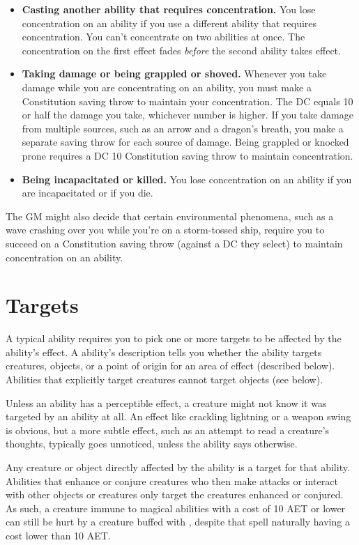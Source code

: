 \begin{itemize}
    \item \textbf{Casting another ability that requires concentration.} You lose concentration on an ability if you use a different ability that requires concentration. You can't concentrate on two abilities at once. The concentration on the first effect fades \textit{before} the second ability takes effect.
    \item \textbf{Taking damage or being grappled or shoved.} Whenever you take damage while you are concentrating on an ability, you must make a Constitution saving throw to maintain your concentration. The DC equals 10 or half the damage you take, whichever number is higher. If you take damage from multiple sources, such as an arrow and a dragon's breath, you make a separate saving throw for each source of damage. Being grappled or knocked prone requires a DC 10 Constitution saving throw to maintain concentration.
    \item \textbf{Being incapacitated or killed.} You lose concentration on an ability if you are incapacitated or if you die. 
\end{itemize}

The GM might also decide that certain environmental phenomena, such as a wave crashing over you while you're on a storm-tossed ship, require you to succeed on a Constitution saving throw (against a DC they select) to maintain concentration on an ability.

\section{Targets \label{sec:targets}}
A typical ability requires you to pick one or more targets to be affected by the ability's effect. A ability's description tells you whether the ability targets creatures, objects, or a point of origin for an area of effect (described below). Abilities that explicitly target creatures cannot target objects (see  below).

Unless an ability has a perceptible effect, a creature might not know it was targeted by an ability at all. An effect like crackling lightning or a weapon swing is obvious, but a more subtle effect, such as an attempt to read a creature's thoughts, typically goes unnoticed, unless the ability says otherwise.

Any creature or object directly affected by the ability is a target for that ability. Abilities that enhance or conjure creatures who then make attacks or interact with other objects or creatures only target the creatures enhanced or conjured. As such, a creature immune to magical abilities with a cost of 10 AET or lower can still be hurt by a creature buffed with , despite that spell naturally having a cost lower than 10 AET.

